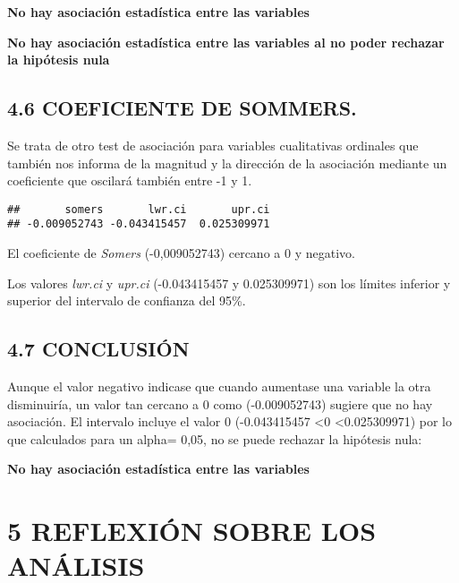\documentclass[
  12 pt,
  a4paper,
]{article}
\newenvironment{Shaded}{\begin{snugshade}}{\end{snugshade}}
\newcommand{\AttributeTok}[1]{\textcolor[rgb]{0.13,0.29,0.53}{#1}}
\newcommand{\FloatTok}[1]{\textcolor[rgb]{0.00,0.00,0.81}{#1}}
\newcommand{\FunctionTok}[1]{\textcolor[rgb]{0.13,0.29,0.53}{\textbf{#1}}}
\newcommand{\NormalTok}[1]{#1}
\newcommand{\OtherTok}[1]{\textcolor[rgb]{0.56,0.35,0.01}{#1}}
\newcommand{\SpecialCharTok}[1]{\textcolor[rgb]{0.81,0.36,0.00}{\textbf{#1}}}
\begin{document}
\textbf{No hay asociación estadística entre las variables}

\textbf{No hay asociación estadística entre las variables al no poder
rechazar la hipótesis nula}

\subsection{4.6 COEFICIENTE DE SOMMERS.}\label{coeficiente-de-sommers.}

Se trata de otro test de asociación para variables cualitativas
ordinales que también nos informa de la magnitud y la dirección de la
asociación mediante un coeficiente que oscilará también entre -1 y 1.

\begin{Shaded}
\end{Shaded}

\begin{verbatim}
##       somers       lwr.ci       upr.ci 
## -0.009052743 -0.043415457  0.025309971
\end{verbatim}

El coeficiente de \emph{Somers} (-0,009052743) cercano a 0 y negativo.

Los valores \emph{lwr.ci} y \emph{upr.ci} (-0.043415457 y 0.025309971)
son los límites inferior y superior del intervalo de confianza del 95\%.

\subsection{4.7 CONCLUSIÓN}\label{conclusiuxf3n-3}

Aunque el valor negativo indicase que cuando aumentase una variable la
otra disminuiría, un valor tan cercano a 0 como (-0.009052743) sugiere
que no hay asociación. El intervalo incluye el valor 0 (-0.043415457
\textless0 \textless0.025309971) por lo que calculados para un alpha=
0,05, no se puede rechazar la hipótesis nula:

\textbf{No hay asociación estadística entre las variables}

\section{5 REFLEXIÓN SOBRE LOS
ANÁLISIS}\label{reflexiuxf3n-sobre-los-anuxe1lisis}
\end{document}
